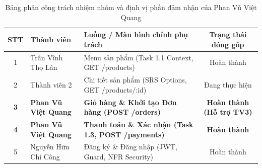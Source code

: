 \documentclass[a4paper]{article}
\begin{document}
\begin{table}[h!]
\centering
\small
\begin{tabular}{|c|l|l|c|}
\hline
\textbf{STT} & \textbf{Thành viên} & \textbf{Luồng / Màn hình chính phụ trách} & \textbf{Trạng thái đóng góp} \\ \hline
1 & Trần Vĩnh Thọ Lân & Menu sản phẩm (Task 1.1 Context, GET /products) & Hoàn thành \\ \hline
2 & Thành viên 2 & Chi tiết sản phẩm (SRS Options, GET /products/:id) & Đang thực hiện \\ \hline
\textbf{3} & \textbf{Phan Vũ Việt Quang} & \textbf{Giỏ hàng \& Khởi tạo Đơn hàng (POST /orders)} & \textbf{Hoàn thành (Hỗ trợ TV3)} \\ \hline
\textbf{4} & \textbf{Phan Vũ Việt Quang} & \textbf{Thanh toán \& Xác nhận (Task 1.3, POST /payments)} & \textbf{Hoàn thành} \\ \hline
5 & Nguyễn Hữu Chí Công & Đăng ký \& Đăng nhập (JWT, Guard, NFR Security) & Hoàn thành \\ \hline
\end{tabular}
\caption{Bảng phân công trách nhiệm nhóm và định vị phần đảm nhận của Phan Vũ Việt Quang}
\end{table}
\end{document}

